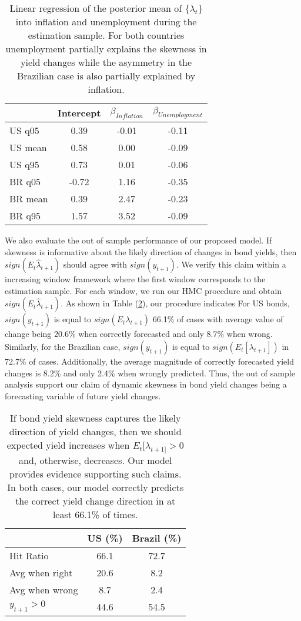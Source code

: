 \documentclass{article}
\begin{document}
\begin{table}[h!]
\centering
\begin{tabular}{lccc}
  \hline
 & Intercept & $\beta_{Inflation}$ & $\beta_{Unemployment}$ \\ 
 \hline 
US q05 & 0.39 & -0.01 & -0.11 \\ 
US mean & 0.58 & 0.00 & -0.09 \\ 
US q95  & 0.73 & 0.01 & -0.06 \\ 
  \hline
BR q05 & -0.72 & 1.16 & -0.35 \\ 
BR mean & 0.39 & 2.47 & -0.23 \\ 
BR q95 & 1.57 & 3.52 & -0.09 \\ 
   \hline
\end{tabular}
\caption{Linear regression of the posterior mean of $\{ \lambda_t \}$ into inflation and unemployment during the estimation sample. For both countries unemployment partially explains the skewness in yield changes while the asymmetry in the Brazilian case is also partially explained by inflation.}
\label{Tab:Yields_linear_reg}
\end{table}

We also evaluate the out of sample performance of our proposed model. If skewness is informative about the likely direction of changes in bond yields, then $sign(E_t  \hat{\lambda}_{t+1})$ should agree with $sign(y_{t+1})$. We verify this claim within a increasing window framework where the first window corresponds to the estimation sample. For each window, we run our HMC procedure and obtain $sign(E_t \hat{\lambda}_{t+1})$. As shown in Table (\ref{Tab:oos_yields}), our procedure indicates For US bonds, $sign(y_{t+1})$ is equal to $sign(E_t\lambda_{t+1})$ 66.1\% of cases with average value of change being 20.6\% when correctly forecasted and only 8.7\% when wrong. Similarly, for the Brazilian case, $sign(y_{t+1})$ is equal to $sign(E_t[\lambda_{t+1}])$ in 72.7\% of cases. Additionally, the average magnitude of correctly forecasted yield changes is 8.2\% and only 2.4\% when wrongly predicted. Thus, the out of sample analysis support our claim of dynamic skewness in bond yield changes being a forecasting variable of future yield changes. 

\begin{table}[h]
\centering
\begin{tabular}{lcc}
\hline
                    & US (\%) & Brazil (\%) \\
\hline
Hit Ratio           & 66.1    & 72.7        \\
Avg when right      & 20.6    & 8.2         \\
Avg when wrong      & 8.7     & 2.4         \\
$y_{t+1} > 0$       & 44.6    & 54.5     \\
\hline
\end{tabular}
\caption{If bond yield skewness captures the likely direction of yield changes, then we should expected yield increases when $E_t[\lambda_{t+1]}>0 $ and, otherwise, decreases. Our model provides evidence supporting such claims. In both cases, our model correctly predicts the correct yield change direction in at least 66.1\% of times.}
\label{Tab:oos_yields}
\end{table}
\end{document}
